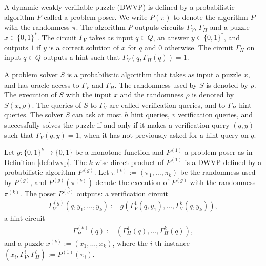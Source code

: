 \begin{definition}
  \label{def:dwvp}
  A dynamic weakly verifiable puzzle (DWVP) is defined by a probabilistic algorithm $P$
  called a problem poser. We write $P(\pi)$ to denote the algorithm $P$ with the randomness $\pi$.
  The algorithm $P$ outputs circuits $\Gamma_{V}$, $\Gamma_{H}$ and a puzzle $x \in \{0,1\}^{*}$.
  The circuit $\Gamma_{V}$ takes as input $q \in Q$, an answer $y \in \{0,1\}^*$,
  and outputs $1$ if $y$ is a correct solution of $x$ for $q$ and $0$ otherwise.
  The circuit $\Gamma_H$ on input $q \in Q$ outputs a hint such that $\Gamma_V(q,\Gamma_H(q)) = 1$.

  A problem solver $S$ is a probabilistic algorithm that takes as input a puzzle $x$,
  and has oracle access to $\Gamma_V$ and $\Gamma_H$.
  The randomness used by $S$ is denoted by $\rho$. The execution of $S$ with the input $x$ and the randomness $\rho$
  is denoted by $S(x, \rho)$. The queries of $S$ to $\Gamma_V$ are called verification queries, and to $\Gamma_H$ hint queries.
  The solver $S$ can ask at most $h$ hint queries, $v$ verification queries, and successfully solves the puzzle if and only if
  it makes a verification query $(q,y)$ such that $\Gamma_V(q,y) = 1$, when it has not previously asked for a hint query on $q$.
\end{definition}
%
%
\begin{definition}
Let $g: \{0,1\}^{k} \rightarrow \{0,1\}$ be a monotone function and $P^{(1)}$ a problem poser as in Definition \ref{def:dwvp}.
The $k$-wise direct product of $P^{(1)}$ is a DWVP defined by a probabilistic algorithm $P^{(g)}$.
Let $\pi^{(k)} := (\pi_1, \dots, \pi_k)$ be the randomness used by $P^{(g)}$, and $P^{(g)}(\pi^{(k)})$ denote the execution of $P^{(g)}$ with the randomness $\pi^{(k)}$.
The poser $P^{(g)}$ outputs:
a verification circuit
\begin{align*}
  \Gamma_V^{(g)} (q, y_1, \dots, y_k) := g(\Gamma_V^{1}(q, y_1), \dots, \Gamma_V^{k}(q, y_k)),
\end{align*}
a hint circuit
\begin{align*}
  \Gamma_H^{(k)} (q) := (\Gamma_H^{1}(q), \dots, \Gamma_H^{k}(q)),
\end{align*}
and a puzzle $x^{(k)} := (x_1, \dots, x_k)$, where the $i$-th instance $(x_i, \Gamma_V^{i}, \Gamma_H^{i} ) := P^{(1)}(\pi_i)$.
\end{definition}
%
